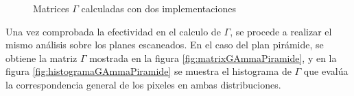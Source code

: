 \begin{figure}[H]
	\centering
	\hfill
	\caption{Matrices $\Gamma$ calculadas con dos implementaciones}
	\label{fig:barraAtravesaGamma}
\end{figure}

Una vez comprobada la efectividad en el calculo de $\Gamma$, se procede a realizar el mismo análisis sobre los planes escaneados. En el caso del plan pirámide, se obtiene la matriz $\Gamma$ mostrada en la figura \ref{fig:matrixGAmmaPiramide}, y en la figura \ref{fig:histogramaGAmmaPiramide} se muestra el histograma de $\Gamma$ que evalúa la correspondencia general de los pixeles en ambas distribuciones.\\


